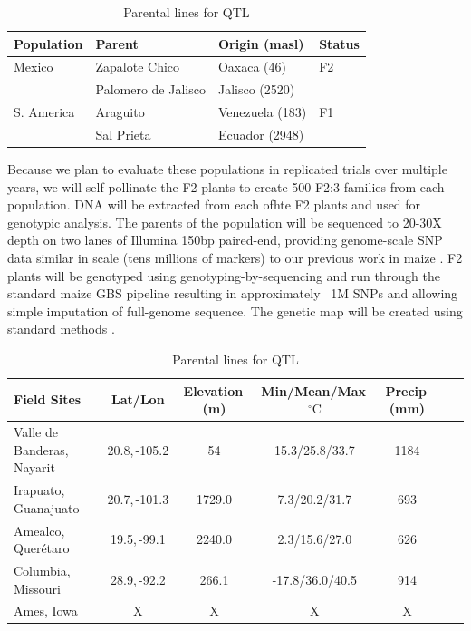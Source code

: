 \begin{table}
\begin{center}
\caption{Parental lines for QTL} \label{tab:qtlpops}
\begin{tabular}{llll}\\\toprule  
{\bf Population}	& {\bf Parent } &	{\bf Origin (masl)} & {\bf Status }\\ \midrule
 \rowcolor{gray!25}
Mexico	& Zapalote Chico		& Oaxaca	 (46)		&  F2 \\ 
 \rowcolor{gray!25}
	& 	Palomero de Jalisco	& 	Jalisco (2520)		& \\
S. America	& Araguito	& Venezuela (183)	&  F1 \\ 
	& Sal Prieta	 & Ecuador (2948) & \\ \bottomrule
\end{tabular}
\end{center}
\end{table} 

Because we plan to evaluate these populations in replicated trials over multiple years, we will self-pollinate the F2 plants to create 500 F2:3 families from each population.  DNA will be extracted from each ofhte F2 plants and used for genotypic analysis.   The parents of the population will be sequenced to 20-30X depth on two lanes of Illumina 150bp paired-end, providing genome-scale SNP data similar in scale (tens millions of markers) to our previous work in maize  \citep[HapMap.v2;][]{Chia2012a}.  F2 plants will be genotyped using genotyping-by-sequencing \citep[GBS;][]{Elshire2011} and run through the standard maize GBS pipeline \citep{Glaubitz2014} resulting in approximately ~1M SNPs and allowing simple imputation of full-genome sequence.  The genetic map will be created using standard methods \citep[e.g.][]{Broman2003a}. 

\begin{table}
\begin{center}
\caption{Parental lines for QTL} \label{tab:locales}
\begin{tabular}{p{2cm}cccccc}\\\toprule  
{\bf Field Sites} & {\bf Lat/Lon } & {\bf Elevation\,(m) } &	{\bf Min/Mean/Max\,$^{\circ}\mathrm{C}$  } & {\bf Precip\,(mm) } \\ \toprule
Valle de Banderas, Nayarit	& 20.8,\,-105.2&	54		&	15.3/25.8/33.7	&	1184 \\
Irapuato, Guanajuato 	&	20.7,\,-101.3	&	1729.0	&	7.3/20.2/31.7	&	693 \\
Amealco, Quer\'etaro 	&	19.5,\,-99.1	&	2240.0 	&	2.3/15.6/27.0	&	626\\
Columbia, Missouri		& 	28.9,\,-92.2	&	266.1 	&	-17.8/36.0/40.5&	914\\
Ames, Iowa	& 	X	&	X 	&	X		&	X	 \\ \bottomrule
\end{tabular}
\end{center}
\end{table} 

